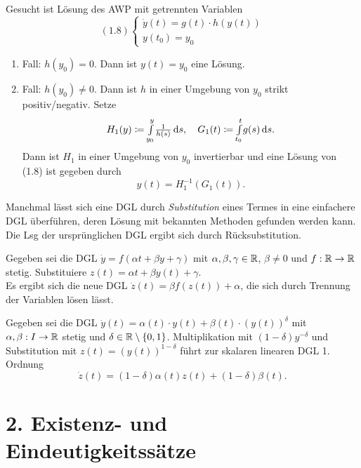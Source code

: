 \documentclass{cheat-sheet}
\begin{document}
\begin{prob}
  Gesucht ist Lösung des AWP mit getrennten Variablen
  \[
    (1.8) \left\{ \begin{array}{l}
      \dot{y}(t) = g(t) \cdot h(y(t))\\
      y(t_0) = y_0
    \end{array} \right.
  \]
\end{prob}

\begin{lsg}
  \begin{enumerate}
    \item Fall: $h(y_0) = 0$. Dann ist $y(t) = y_0$ eine Lösung.
    \item Fall: $h(y_0) \not= 0$. Dann ist $h$ in einer Umgebung von $y_0$ strikt positiv/negativ. Setze
    \[
      H_1(y) \coloneqq {\textstyle \int\limits_{y_0}^{y}} \tfrac{1}{h(s)} \,\mathrm{d} s, \quad
      G_1(t) \coloneqq {\textstyle \int\limits_{t_0}^{t}} g(s) \,\mathrm{d} s.
    \]
    Dann ist $H_1$ in einer Umgebung von $y_0$ invertierbar und eine Lösung von (1.8) ist gegeben durch
    \[ y(t) = H_1^{-1}(G_1(t)). \]
  \end{enumerate}
\end{lsg}


\begin{technik}[Transformation]
  Manchmal lässt sich eine DGL durch \emph{Substitution} eines Termes in eine einfachere DGL überführen, deren Lösung mit bekannten Methoden gefunden werden kann. \\
  Die Lsg der ursprünglichen DGL ergibt sich durch Rücksubstitution.
\end{technik}

\begin{samepage}
\begin{bsp}
  Gegeben sei die DGL $\dot{y} = f(\alpha t + \beta y + \gamma)$ mit $\alpha, \beta, \gamma \in \mathbb{R}$, $\beta \not= 0$ und $f : \mathbb{R} \to \mathbb{R}$ stetig.
  Substituiere $z(t) = \alpha t + \beta y(t) + \gamma$. \\
  Es ergibt sich die neue DGL $\dot{z}(t) = \beta f(z(t)) + \alpha$, die sich durch Trennung der Variablen lösen lässt.
\end{bsp}

\begin{bsp}
  Gegeben sei die DGL $\dot{y}(t) = \alpha(t) \cdot y(t) + \beta(t) \cdot (y(t))^{\delta}$ mit $\alpha, \beta : I \to \mathbb{R}$ stetig und $\delta \in \mathbb{R} \setminus \{0,1\}$. Multiplikation mit $(1-\delta) y^{-\delta}$ und Substitution mit $z(t) = (y(t))^{1-\delta}$ führt zur skalaren linearen DGL 1. Ordnung
  \[ \dot{z}(t) = (1-\delta) \alpha(t) z(t) + (1-\delta) \beta(t). \]
\end{bsp}



\section{2. Existenz- und Eindeutigkeitssätze}
\end{samepage}
\end{document}
